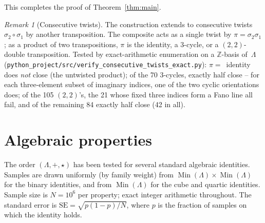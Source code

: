 \documentclass[twoside,english]{paper}
\numberwithin{equation}{section}
\numberwithin{figure}{section}
\theoremstyle{definition}
\theoremstyle{remark}
\newtheorem{remark}[theorem]{Remark}
\newcommand{\ZZ}{\mathbb{Z}}
\newcommand{\LL}{\Lambda}             %
\begin{document}
This completes the proof of Theorem~\ref{thm:main}.

\begin{remark}[Consecutive twists]\label{rem:consecutive-twists}
The construction extends to consecutive twists $\sigma_2 \circ \sigma_1$
by another transposition.  The composite acts as a single twist by
$\pi = \sigma_2 \sigma_1$; as a product of two transpositions, $\pi$
is the identity, a 3-cycle, or a $(2,2)$-double transposition.  Tested
by exact-arithmetic enumeration on a $\ZZ$-basis of~$\LL$
(\texttt{python\_project/src/verify\_consecutive\_twists\_exact.py}):
$\pi = $~identity does \emph{not} close (the untwisted product); of
the 70 3-cycles, exactly half close -- for each three-element subset
of imaginary indices, one of the two cyclic orientations does; of
the 105 $(2,2)$'s, the 21 whose fixed three indices form a Fano line
all fail, and of the remaining 84 exactly half close (42 in all).
\end{remark}

\section{Algebraic properties}\label{sec:properties}

The order $(\LL, +, \star)$ has been tested for several standard
algebraic identities.  Samples are drawn uniformly (by family weight)
from $\operatorname{Min}(\LL) \times \operatorname{Min}(\LL)$ for the
binary identities, and from $\operatorname{Min}(\LL)$ for the cube and
quartic identities.  Sample size is $N = 10^6$ per property; exact
integer arithmetic throughout.  The standard error is $\mathrm{SE} =
\sqrt{p(1-p)/N}$, where $p$ is the fraction of samples on which the
identity holds.
\end{document}
